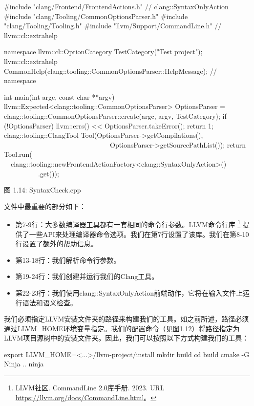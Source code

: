 \begin{cpp}
#include "clang/Frontend/FrontendActions.h" // clang::SyntaxOnlyAction
#include "clang/Tooling/CommonOptionsParser.h"
#include "clang/Tooling/Tooling.h"
#include "llvm/Support/CommandLine.h" // llvm::cl::extrahelp

namespace {
  llvm::cl::OptionCategory TestCategory("Test project");
  llvm::cl::extrahelp
    CommonHelp(clang::tooling::CommonOptionsParser::HelpMessage);
} // namespace

int main(int argc, const char **argv) {
  llvm::Expected<clang::tooling::CommonOptionsParser> OptionsParser =
    clang::tooling::CommonOptionsParser::create(argc, argv, TestCategory);
  if (!OptionsParser) {
    llvm::errs() << OptionsParser.takeError();
    return 1;
  }
  clang::tooling::ClangTool Tool(OptionsParser->getCompilations(),
                                 OptionsParser->getSourcePathList());
  return Tool.run(
    clang::tooling::newFrontendActionFactory<clang::SyntaxOnlyAction>()
            .get());
}
\end{cpp}

\begin{center}
图 1.14: SyntaxCheck.cpp
\end{center}

文件中最重要的部分如下：

\begin{itemize}
\item
第7-9行：大多数编译器工具都有一套相同的命令行参数。LLVM命令行库 \footnote{LLVM社区. CommandLine 2.0库手册. 2023. URL \url{https://llvm.org/docs/CommandLine.html}。} 提供了一些API来处理编译器命令选项。我们在第7行设置了该库。我们在第8-10行设置了额外的帮助信息。

\item
第13-18行：我们解析命令行参数。

\item
第19-24行：我们创建并运行我们的Clang工具。

\item
第22-23行：我们使用clang::SyntaxOnlyAction前端动作，它将在输入文件上运行语法和语义检查。
\end{itemize}

我们必须指定LLVM安装文件夹的路径来构建我们的工具。如之前所述，路径必须通过LLVM\_HOME环境变量指定。我们的配置命令（见图1.12）将路径指定为LLVM项目源树中的安装文件夹。因此，我们可以按照以下方式构建我们的工具：

\begin{shell}
export LLVM_HOME=<...>/llvm-project/install
mkdir build
cd build
cmake -G Ninja ..
ninja
\end{shell}

